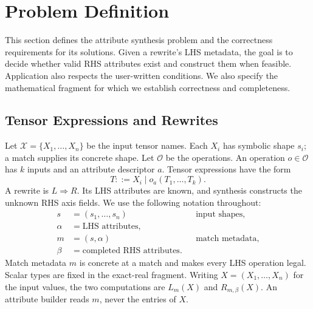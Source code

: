 \section{Problem Definition}
\label{sec:problem}
This section defines the attribute synthesis problem and the correctness
requirements for its solutions. Given a rewrite's LHS metadata, the goal is
to decide whether valid RHS attributes exist and construct them when
feasible. Application also respects the user-written conditions. We also
specify the mathematical fragment for which we establish correctness and completeness.

\subsection{Tensor Expressions and Rewrites}
Let $\mathcal X=\{X_1,\ldots,X_n\}$ be the input tensor names. Each $X_i$ has
symbolic shape $s_i$; a match supplies its concrete shape. Let $\mathcal O$
be the operations. An operation $o\in\mathcal O$ has $k$ inputs and an
attribute descriptor $a$. Tensor expressions have the form
\begin{equation}
 T ::= X_i \mid o_a(T_1,\ldots,T_k).
\end{equation}
A rewrite is $L\Rightarrow R$. Its LHS attributes are known, and synthesis
constructs the unknown RHS axis fields. We use the following notation throughout:
\begin{equation}
\begin{aligned}
 s&=(s_1,\ldots,s_n) &&\text{input shapes},\\
 \alpha&=\text{LHS attributes},\\
 m&=(s,\alpha) &&\text{match metadata},\\
 \beta&=\text{completed RHS attributes}.
\end{aligned}
\label{eq:metadata}
\end{equation}
Match metadata $m$ is concrete at a match and makes every LHS operation legal.
Scalar types are fixed in the exact-real fragment.
Writing $X=(X_1,\ldots,X_n)$ for the input values, the two computations are
$L_m(X)$ and $R_{m,\beta}(X)$. An attribute builder reads $m$, never the
entries of $X$.

